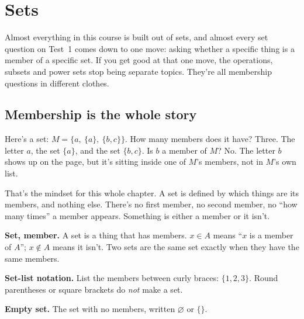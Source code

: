 \newcommand{\setsP}{\mathcal{P}}
\newcommand{\setsSt}{\mathrel{|}}
\newcommand{\setsVenn}[3]{%
  \begin{scope}[xshift=#1]
    \path[use as bounding box] (-0.2,-1.55) rectangle (2.5,1.1);
    #2
    \draw (-0.1,-0.95) rectangle (2.4,0.95);
    \node[font=\scriptsize,anchor=north west,inner sep=1.5pt] at (-0.1,0.95) {$\mathcal{U}$};
    \draw (0.8,0) circle (0.62);
    \draw (1.5,0) circle (0.62);
    \node[font=\scriptsize] at (0.45,0) {$A$};
    \node[font=\scriptsize] at (1.85,0) {$B$};
    \node[font=\small] at (1.15,-1.3) {#3};
  \end{scope}}

\section{Sets}

Almost everything in this course is built out of sets, and almost every set question on Test~1 comes down to one move: asking whether a specific thing is a member of a specific set. If you get good at that one move, the operations, subsets and power sets stop being separate topics. They're all membership questions in different clothes.

\subsection{Membership is the whole story}

Here's a set: $M=\{a,\ \{a\},\ \{b,c\}\}$. How many members does it have? Three. The letter $a$, the set $\{a\}$, and the set $\{b,c\}$. Is $b$ a member of $M$? No. The letter $b$ shows up on the page, but it's sitting inside one of $M$'s members, not in $M$'s own list.

That's the mindset for this whole chapter. A set is defined by which things are its members, and nothing else. There's no first member, no second member, no ``how many times'' a member appears. Something is either a member or it isn't.

\begin{notebox}
\textbf{Set, member.} A set is a thing that has members. $x\in A$ means ``$x$ is a member of $A$''; $x\notin A$ means it isn't. Two sets are the same set exactly when they have the same members.

\textbf{Set-list notation.} List the members between curly braces: $\{1,2,3\}$. Round parentheses or square brackets do \emph{not} make a set.

\textbf{Empty set.} The set with no members, written $\varnothing$ or $\{\}$.
\end{notebox}

